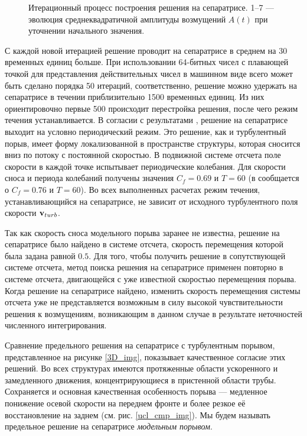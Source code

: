 \begin{figure}[h]
\caption{Итерационный процесс построения решения на сепаратрисе. 1--7 --- эволюция среднеквадратичной амплитуды возмущений $A(t)$ при уточнении начального
значения.}
\label{bisection_pic}
\end{figure}

С каждой новой итерацией решение проводит на сепаратрисе в среднем на 30 временных единиц больше. При использовании 64-битных чисел с плавающей точкой для представления действительных чисел в машинном виде всего может быть сделано порядка 50 итераций, соответственно, решение можно удержать на сепаратрисе в течении приблизительно 1500 временных единиц. Из них ориентировочно первые 500 происходит перестройка решения, после чего режим течения устанавливается. В согласии с результатами \cite{Avila2013}, решение на сепаратрисе выходит на условно периодический режим. Это решение, как и турбулентный порыв, имеет форму локализованной в пространстве структуры, которая сносится вниз по потоку с постоянной скоростью. В подвижной системе отсчета поле скорости в каждой точке испытывает периодические колебания. Для скорости сноса и периода колебаний получены значения $C_f=0.69$ и $T=60$ (в \cite{Avila2013} сообщается о $C_f=0.76$ и $T=60$). Во всех выполненных расчетах режим течения, устанавливающийся на сепаратрисе, не зависит от исходного турбулентного поля скорости $\mathbf{v}_{turb}$. 

Так как скорость сноса модельного порыва заранее не известна, решение на сепаратрисе было найдено в системе отсчета, скорость перемещения которой была задана равной $0.5$. Для того, чтобы получить решение в сопутствующей системе отсчета, метод поиска решения на сепаратрисе применен повторно в системе отсчета, двигающейся с уже известной скоростью перемещения порыва. Когда решение на сепаратрисе найдено, изменить скорость перемещения системы отсчета уже не представляется возможным в силу высокой чувствительности решения к возмущениям, возникающим в данном случае в результате неточностей численного интегрирования. 

Сравнение предельного решения на сепаратрисе с турбулентным порывом, представленное на рисунке \ref{3D_img}, показывает качественное согласие этих решений. Во всех структурах имеются протяженные области ускоренного и замедленного движения, концентрирующиеся в пристенной области трубы. Сохраняется и основная качественная особенность порыва --- медленное понижение осевой скорости на переднем фронте и более резкое её восстановление на заднем (см. рис. \ref{ucl_cmp_img}). Мы будем называть предельное решение на сепаратрисе {\it модельным порывом}.  

